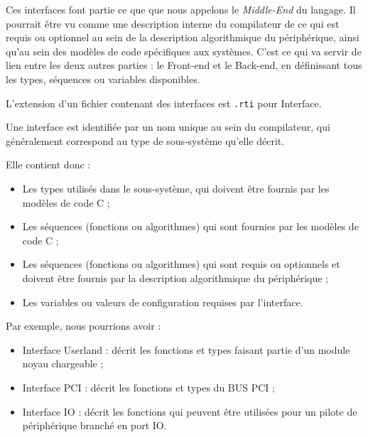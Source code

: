 \documentclass[french]{rtxreport}
\begin{document}
Ces interfaces font partie ce que que nous appelons le \emph{Middle-End} du
langage. Il pourrait être vu comme une description interne du compilateur de ce
qui est requis ou optionnel au sein de la description algorithmique du
périphérique, ainsi qu'au sein des modèles de code spécifiques aux systèmes.
C'est ce qui va servir de lien entre les deux autres parties : le Front-end et
le Back-end, en définissant tous les types, séquences ou variables disponibles.

L'extension d'un fichier contenant des interfaces est \texttt{.rti} pour \rtx
Interface.

Une interface est identifiée par un nom unique au sein du compilateur, qui
généralement correspond au type de sous-système qu'elle décrit.

Elle contient donc :
\begin{itemize}
    \item Les types utilisés dans le sous-système, qui doivent être fournis par
        les modèles de code C ;
    \item Les séquences (fonctions ou algorithmes) qui sont fournies par les
        modèles de code C ;
    \item Les séquences (fonctions ou algorithmes) qui sont requis ou optionnels
        et doivent être fournis par la description algorithmique du
        périphérique ;
    \item Les variables ou valeurs de configuration requises par l'interface.
\end{itemize}

Par exemple, nous pourrions avoir :
\begin{itemize}
    \item Interface Userland : décrit les fonctions et types faisant partie
        d'un module noyau chargeable ;
    \item Interface PCI : décrit les fonctions et types du BUS PCI ;
    \item Interface IO : décrit les fonctions qui peuvent être utilisées pour
        un pilote de périphérique branché en port IO.
\end{itemize}
\end{document}
